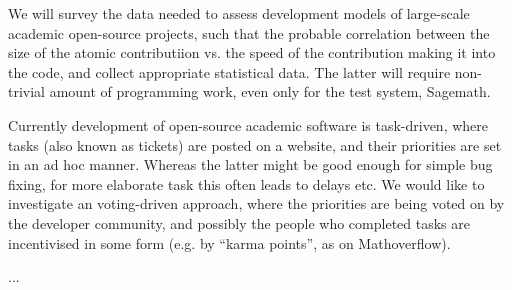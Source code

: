 \begin{workpackage}[id=social-aspects,wphases=1-48!.5,
  title=Social Aspects,
  lead=UO,
  UORM=1,USHRM=8]
\begin{tasklist}
\begin{task}[title=Survey and collection of needed data,id=datacollection]
We will survey the data needed to assess development models of 
large-scale academic open-source projects, 
such that the probable correlation between the size of the atomic contributiion
vs. the speed of the contribution making it into the code, 
and collect appropriate statistical data. The latter will require non-trivial
amount of programming work, even only for the test system, Sagemath.
\end{task}

\begin{task}[title=Collective decision making in developement,id=decisionmaking]
Currently development of open-source academic software is task-driven, where tasks (also
known as tickets) are posted on a website, and their priorities are set in an ad hoc manner.
Whereas the latter might be good enough for simple bug fixing, for more elaborate task this
often leads to delays etc.
We would like to investigate an voting-driven approach, where the priorities are being
voted on by the developer community, and possibly the people who completed tasks
are incentivised in some form (e.g. by ``karma points'', as on Mathoverflow).
\end{task}

\end{tasklist}


\begin{wpdelivs}
  \begin{wpdeliv}[due=12,id=social-...,dissem=PU,nature=??]
      {...}
\end{wpdeliv}
\end{wpdelivs}
\end{workpackage}
